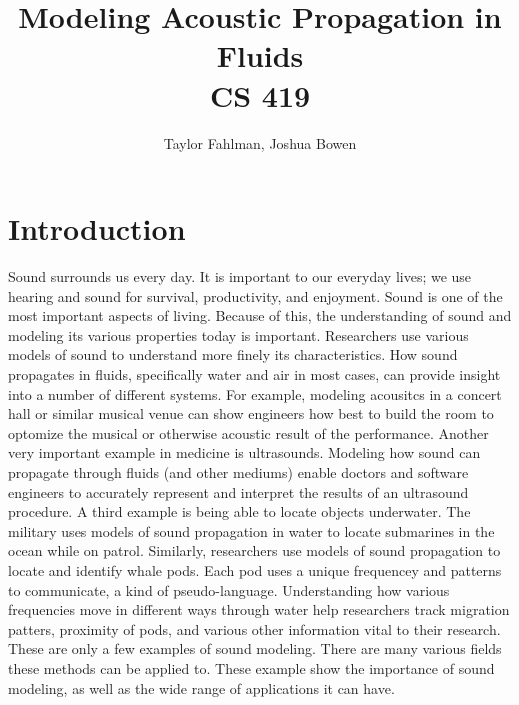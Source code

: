 \documentclass{article}
\begin{document}
\title{Modeling Acoustic Propagation in Fluids\\
CS 419}
\author{Taylor Fahlman, Joshua Bowen}
\maketitle

\section{Introduction}

Sound surrounds us every day. It is important to our everyday lives; we use hearing and sound for survival,
productivity, and enjoyment. Sound is one of the most important aspects of living. Because of this, the 
understanding of sound and modeling its various properties today is important. Researchers use various
models of sound to understand more finely its characteristics. How sound propagates in fluids, specifically
water and air in most cases, can provide insight into a number of different systems. For example, modeling
acousitcs in a concert hall or similar musical venue can show engineers how best to build the room to
optomize the musical or otherwise acoustic result of the performance. Another very important example
in medicine is ultrasounds. Modeling how sound can propagate through fluids (and other mediums) enable
doctors and software engineers to accurately represent and interpret the results of an ultrasound
procedure. A third example is being able to locate objects underwater. The military uses models
of sound propagation in water to locate submarines in the ocean while on patrol. Similarly,
researchers use models of sound propagation to locate and identify whale pods. Each pod uses
a unique frequencey and patterns to communicate, a kind of pseudo-language. Understanding how
various frequencies move in different ways through water help researchers track migration patters,
proximity of pods, and various other information vital to their research. These are only a few
examples of sound modeling. There are many various fields these methods can be applied to. These
example show the importance of sound modeling, as well as the wide range of applications it can have.

\newpage
\end{document}
